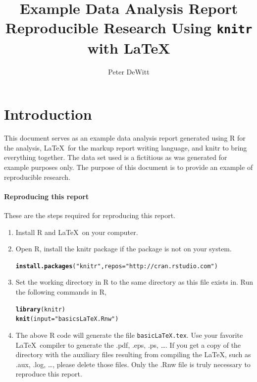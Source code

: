 \documentclass[letterpaper, 10pt]{article}\usepackage[]{graphicx}\usepackage[]{color}
\title{Example Data Analysis Report\\Reproducible Research Using {\tt knitr}
with \LaTeX}
\author{Peter DeWitt}
\makeatletter
\newcommand{\hlstr}[1]{\textcolor[rgb]{0.192,0.494,0.8}{#1}}%
\newcommand{\hlstd}[1]{\textcolor[rgb]{0.345,0.345,0.345}{#1}}%
\newcommand{\hlkwc}[1]{\textcolor[rgb]{0.333,0.667,0.333}{#1}}%
\newcommand{\hlkwd}[1]{\textcolor[rgb]{0.737,0.353,0.396}{\textbf{#1}}}%
\newenvironment{kframe}{%
 \def\at@end@of@kframe{}%
 \ifinner\ifhmode%
  \def\at@end@of@kframe{\end{minipage}}%
  \begin{minipage}{\columnwidth}%
 \fi\fi%
 \def\FrameCommand##1{\hskip\@totalleftmargin \hskip-\fboxsep
 \colorbox{shadecolor}{##1}\hskip-\fboxsep
     \hskip-\linewidth \hskip-\@totalleftmargin \hskip\columnwidth}%
 \MakeFramed {\advance\hsize-\width
   \@totalleftmargin\z@ \linewidth\hsize
   \@setminipage}}%
 {\par\unskip\endMakeFramed%
 \at@end@of@kframe}
\newenvironment{knitrout}{}{} %
\makeatother
\begin{document}
\maketitle

\section{Introduction \label{sec:introduction}}  %

This document serves as an example data analysis report generated using R for
the analysis, \LaTeX\ for the markup report writing language, and knitr to bring
everything together.   The data set used is a fictitious as was generated for
example purposes only.  The purpose of this document is to provide an example of
reproducible research.

\paragraph{Reproducing this report}  These are the steps required for
reproducing this report.
\begin{enumerate}
  \item Install R and \LaTeX\ on your computer.

  \item Open R, install the knitr package if the package is not on your system.
\begin{knitrout}
\color{fgcolor}\begin{kframe}
\begin{alltt}
\hlkwd{install.packages}\hlstd{(}\hlstr{"knitr"}\hlstd{,} \hlkwc{repos} \hlstd{=} \hlstr{"http://cran.rstudio.com"}\hlstd{)}
\end{alltt}
\end{kframe}
\end{knitrout}


  \item Set the working directory in R to the same directory as this file exists
    in.  Run the following commands in R, 
\begin{knitrout}
\color{fgcolor}\begin{kframe}
\begin{alltt}
\hlkwd{library}\hlstd{(knitr)}
\hlkwd{knit}\hlstd{(}\hlkwc{input} \hlstd{=} \hlstr{"basicsLaTeX.Rnw"}\hlstd{)}
\end{alltt}
\end{kframe}
\end{knitrout}


  \item The above R code will generate the file {\tt basicLaTeX.tex}.  Use your
    favorite \LaTeX\ compiler to generate the .pdf, .eps, .ps, \ldots.  If you
    get a copy of the directory with the auxiliary files resulting from compiling
    the \LaTeX, such as .aux, .log, \ldots, please delete those files.  Only the
    .Rnw file is truly necessary to reproduce this report.
\end{enumerate}
\end{document}
